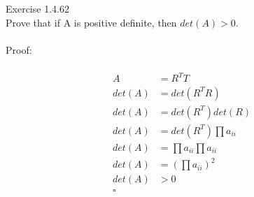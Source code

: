 \documentclass{article}
\begin{document}
	Exercise 1.4.62\\
	Prove that if A is positive definite, then $det(A) > 0$.\\
	\\
	Proof:\\
	\\
	\begin{align*}
		A &= R^TT\\
		det(A) &= det(R^TR)\\
		det(A) &= det(R^T)det(R)\\		
		det(A) &= det(R^T)\prod{a_{ii}}\\		
		det(A) &= \prod{a_{ii}}\prod{a_{ii}}\\				
		det(A) &= (\prod{a_{ii}})^2\\			
		det(A) &> 0\\					
		\square
	\end{align*}
\end{document}
